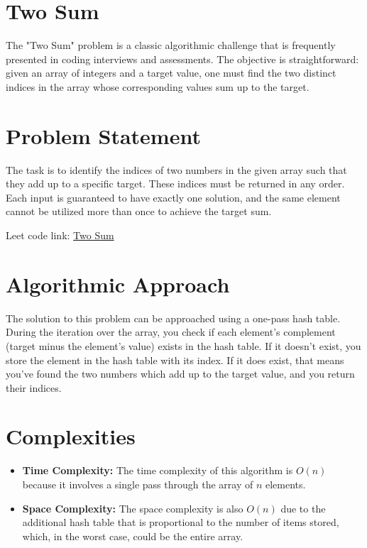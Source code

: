 \section*{Two Sum}
\label{sec:Two_Sum}
The "Two Sum" problem is a classic algorithmic challenge that is frequently presented in coding interviews and assessments. The objective is straightforward: given an array of integers and a target value, one must find the two distinct indices in the array whose corresponding values sum up to the target.

\section*{Problem Statement}
The task is to identify the indices of two numbers in the given array such that they add up to a specific target. These indices must be returned in any order. Each input is guaranteed to have exactly one solution, and the same element cannot be utilized more than once to achieve the target sum.

Leet code link: \href{https://leetcode.com/problems/two-sum/}{Two Sum}

\section*{Algorithmic Approach}
The solution to this problem can be approached using a one-pass hash table. During the iteration over the array, you check if each element's complement (target minus the element's value) exists in the hash table. If it doesn't exist, you store the element in the hash table with its index. If it does exist, that means you've found the two numbers which add up to the target value, and you return their indices.

\section*{Complexities}
\begin{itemize}
	\item \textbf{Time Complexity:} The time complexity of this algorithm is \(O(n)\) because it involves a single pass through the array of \(n\) elements.
	\item \textbf{Space Complexity:} The space complexity is also \(O(n)\) due to the additional hash table that is proportional to the number of items stored, which, in the worst case, could be the entire array.
\end{itemize}


